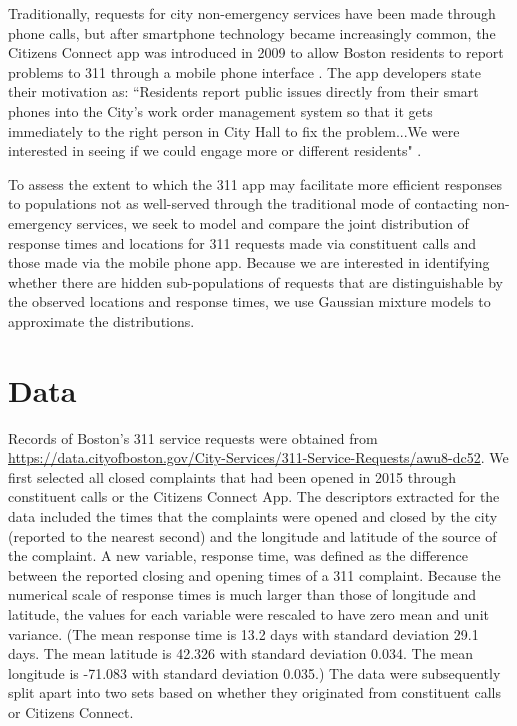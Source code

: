 \documentclass[twoside]{article}
\theoremstyle{theorem}
\theoremstyle{theorem}
\theoremstyle{theorem}
\theoremstyle{lemma}
\theoremstyle{definition}
\theoremstyle{example}
\begin{document}
Traditionally, requests for city non-emergency services have been made through phone calls, but after smartphone technology became increasingly common, the Citizens Connect app was introduced in 2009 to allow Boston residents to report problems to 311 through a mobile phone interface \cite{newurbanmechanics}. The app developers state their motivation as: ``Residents report public issues directly from their smart phones into the City's work order management system so that it gets immediately to the right person in City Hall to fix the problem...We were interested in seeing if we could engage more or different residents" \cite{newurbanmechanics}.  

To assess the extent to which the 311 app may facilitate more efficient responses to populations not as well-served through the traditional mode of contacting non-emergency services, we seek to model and compare the joint distribution of response times and locations for 311 requests made via constituent calls and those made via the mobile phone app. Because we are interested in identifying whether there are hidden sub-populations of requests that are distinguishable by the observed locations and response times, we use Gaussian mixture models to approximate the distributions. 
\section{Data}
Records of Boston's 311 service requests were obtained from \url{https://data.cityofboston.gov/City-Services/311-Service-Requests/awu8-dc52}. We first selected all closed complaints that had been opened in 2015 through constituent calls or the Citizens Connect App. The descriptors extracted for the data included the times that the complaints were opened and closed by the city (reported to the nearest second) and the longitude and latitude of the source of the complaint. A new variable, response time, was defined as the difference between the reported closing and opening times of a 311 complaint. Because the numerical scale of response times is much larger than those of longitude and latitude, the values for each variable were rescaled to have zero mean and unit variance. (The mean response time is 13.2 days with standard deviation 29.1 days. The mean latitude is 42.326 with standard deviation 0.034. The mean longitude is -71.083 with standard deviation 0.035.) The data were subsequently split apart into two sets based on whether they originated from constituent calls or Citizens Connect. 
\end{document}
